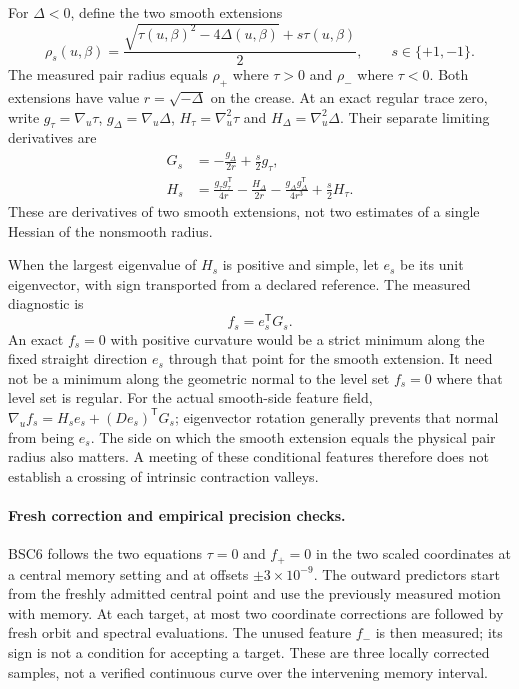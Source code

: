 \documentclass[11pt,letterpaper]{article}
\begin{document}
For $\Delta<0$, define the two smooth extensions
\begin{equation}
 \rho_s(u,\beta)=\frac{\sqrt{\tau(u,\beta)^2-4\Delta(u,\beta)}+s\tau(u,\beta)}{2},
 \qquad s\in\{+1,-1\}.
 \label{eq:memorymixedextensions}
\end{equation}
The measured pair radius equals $\rho_+$ where $\tau>0$ and $\rho_-$ where
$\tau<0$. Both extensions have value $r=\sqrt{-\Delta}$ on the crease.
At an exact regular trace zero, write $g_\tau=\nabla_u\tau$,
$g_\Delta=\nabla_u\Delta$, $H_\tau=\nabla_u^2\tau$ and
$H_\Delta=\nabla_u^2\Delta$. Their separate limiting derivatives are
\begin{align}
 G_s&=-\frac{g_\Delta}{2r}+\frac{s}{2}g_\tau,\nonumber\\
 H_s&=\frac{g_\tau g_\tau^{\mathsf T}}{4r}
       -\frac{H_\Delta}{2r}
       -\frac{g_\Delta g_\Delta^{\mathsf T}}{4r^3}
       +\frac{s}{2}H_\tau.
 \label{eq:memorymixedjets}
\end{align}
These are derivatives of two smooth extensions, not two estimates of a
single Hessian of the nonsmooth radius.

When the largest eigenvalue of $H_s$ is positive and simple, let $e_s$ be
its unit eigenvector, with sign transported from a declared reference.
The measured diagnostic is
\begin{equation}
 f_s=e_s^{\mathsf T}G_s.
 \label{eq:memorymixedfeature}
\end{equation}
An exact $f_s=0$ with positive curvature would be a strict minimum along
the fixed straight direction $e_s$ through that point for the smooth
extension. It need not be a minimum along the geometric normal to the
level set $f_s=0$ where that level set is regular. For the actual smooth-side feature field,
$\nabla_u f_s=H_s e_s+(D e_s)^{\mathsf T}G_s$;
eigenvector rotation generally prevents that normal from being $e_s$.
The side on which the smooth extension equals the physical pair radius
also matters. A meeting of these conditional features therefore does not
establish a crossing of intrinsic contraction valleys.

\paragraph{Fresh correction and empirical precision checks.}
BSC6 follows the two equations $\tau=0$ and $f_+=0$ in the two scaled
coordinates at a central memory setting and at offsets $\pm3\times10^{-9}$.
The outward predictors start from the freshly admitted central point and
use the previously measured motion with memory. At each target, at most
two coordinate corrections are followed by fresh orbit and spectral
evaluations. The unused feature $f_-$ is then measured; its sign is not a
condition for accepting a target. These are three locally corrected
samples, not a verified continuous curve over the intervening memory
interval.
\end{document}
